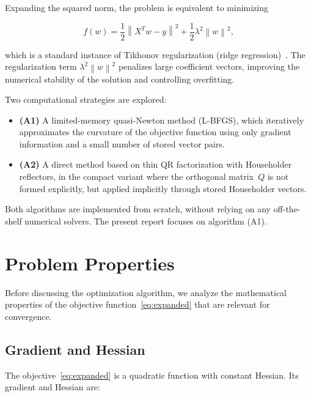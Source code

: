 \documentclass[11pt,a4paper]{article}
\newcommand{\norm}[1]{\left\|#1\right\|}
\begin{document}
Expanding the squared norm, the problem is equivalent to minimizing

\begin{equation}
\label{eq:expanded}
    f(w) = \frac{1}{2}\norm{X^T w - y}^2 + \frac{1}{2}\lambda^2 \norm{w}^2,
\end{equation}

which is a standard instance of Tikhonov regularization (ridge regression)~\cite{hastie2009elements}. 
The regularization term $\lambda^2\norm{w}^2$ penalizes large coefficient vectors, 
improving the numerical stability of the solution and controlling overfitting.

Two computational strategies are explored:

\begin{itemize}[nosep]
    \item \textbf{(A1)} A limited-memory quasi-Newton method (L-BFGS), which iteratively 
    approximates the curvature of the objective function using only gradient information 
    and a small number of stored vector pairs.
    \item \textbf{(A2)} A direct method based on thin QR factorization with Householder 
    reflectors, in the compact variant where the orthogonal matrix~$Q$ is not formed 
    explicitly, but applied implicitly through stored Householder vectors.
\end{itemize}

Both algorithms are implemented from scratch, without relying on any off-the-shelf 
numerical solvers. The present report focuses on algorithm (A1).


\section{Problem Properties}
\label{sec:properties}

Before discussing the optimization algorithm, we analyze the mathematical properties 
of the objective function~\eqref{eq:expanded} that are relevant for convergence.

\subsection{Gradient and Hessian}

The objective~\eqref{eq:expanded} is a quadratic function with constant Hessian. 
Its gradient and Hessian are:
\end{document}
